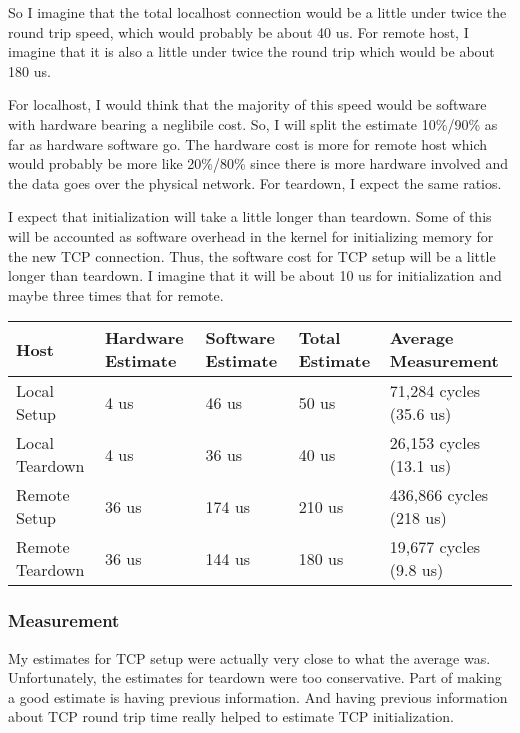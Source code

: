 \documentclass[paper=a4, fontsize=11pt]{scrartcl}
\numberwithin{equation}{section}        %
\numberwithin{figure}{section}          %
\numberwithin{table}{section}               %
\begin{document}
So I imagine that the total localhost connection would be a little under twice the round trip speed, which would probably be about 40 us.  For remote host, I imagine that it is also a little under twice the round trip which would be about 180 us.  

For localhost, I would think that the majority of this speed would be software with hardware bearing a neglibile cost.  So, I will split the estimate 10\%/90\% as far as hardware software go.  The hardware cost is more for remote host which would probably be more like 20\%/80\% since there is more hardware involved and the data goes over the physical network.  For teardown, I expect the same ratios.

I expect that initialization will take a little longer than teardown.  Some of this will be accounted as software overhead in the kernel for initializing memory for the new TCP connection.  Thus, the software cost for TCP setup will be a little longer than teardown.  I imagine that it will be about 10 us for initialization and maybe three times that for remote.

\begin{center}
    \begin{tabular}{ | l | l | l | l | l |}
    \hline
    Host & Hardware Estimate & Software Estimate & Total Estimate & Average Measurement \\      \hline
    Local Setup & 4 us & 46 us & 50 us & 71,284 cycles (35.6 us) \\ 
    Local Teardown & 4 us & 36 us & 40 us & 26,153 cycles (13.1 us) \\ 
    Remote Setup & 36 us & 174 us & 210 us & 436,866 cycles (218 us) \\
    Remote Teardown & 36 us & 144 us & 180 us & 19,677 cycles (9.8 us) \\
    \hline
    \end{tabular}
\end{center}

\subsubsection{Measurement}

My estimates for TCP setup were actually very close to what the average was.  Unfortunately, the estimates for teardown were too conservative.  Part of making a good estimate is having previous information.  And having previous information about TCP round trip time really helped to estimate TCP initialization.
\end{document}
